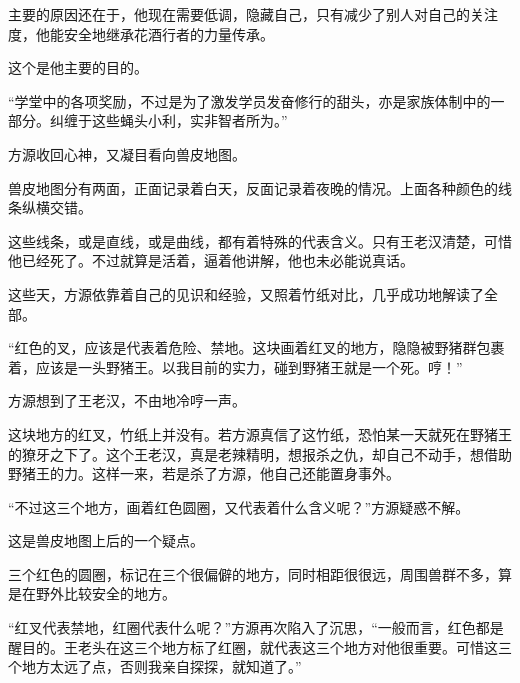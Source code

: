 \begin{this_body}
主要的原因还在于，他现在需要低调，隐藏自己，只有减少了别人对自己的关注度，他能安全地继承花酒行者的力量传承。

这个是他主要的目的。

“学堂中的各项奖励，不过是为了激发学员发奋修行的甜头，亦是家族体制中的一部分。纠缠于这些蝇头小利，实非智者所为。”

方源收回心神，又凝目看向兽皮地图。

兽皮地图分有两面，正面记录着白天，反面记录着夜晚的情况。上面各种颜色的线条纵横交错。

这些线条，或是直线，或是曲线，都有着特殊的代表含义。只有王老汉清楚，可惜他已经死了。不过就算是活着，逼着他讲解，他也未必能说真话。

这些天，方源依靠着自己的见识和经验，又照着竹纸对比，几乎成功地解读了全部。

“红色的叉，应该是代表着危险、禁地。这块画着红叉的地方，隐隐被野猪群包裹着，应该是一头野猪王。以我目前的实力，碰到野猪王就是一个死。哼！”

方源想到了王老汉，不由地冷哼一声。

这块地方的红叉，竹纸上并没有。若方源真信了这竹纸，恐怕某一天就死在野猪王的獠牙之下了。这个王老汉，真是老辣精明，想报杀之仇，却自己不动手，想借助野猪王的力。这样一来，若是杀了方源，他自己还能置身事外。

“不过这三个地方，画着红色圆圈，又代表着什么含义呢？”方源疑惑不解。

这是兽皮地图上后的一个疑点。

三个红色的圆圈，标记在三个很偏僻的地方，同时相距很很远，周围兽群不多，算是在野外比较安全的地方。

“红叉代表禁地，红圈代表什么呢？”方源再次陷入了沉思，“一般而言，红色都是醒目的。王老头在这三个地方标了红圈，就代表这三个地方对他很重要。可惜这三个地方太远了点，否则我亲自探探，就知道了。”

\end{this_body}


